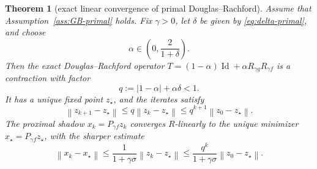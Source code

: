 \documentclass[10pt,leqno]{amsart}
\numberwithin{equation}{section}
\numberwithin{algorithm}{section}
\newtheorem{theorem}{Theorem}[section]
\theoremstyle{remark}
\newcommand{\Id}{\operatorname{Id}}
\newcommand{\norm}[1]{\left\lVert #1 \right\rVert}
\begin{document}
\begin{theorem}[exact linear convergence of primal Douglas--Rachford]
\label{thm:exact-linear-DR}
Assume that Assumption~\ref{ass:GB-primal} holds.  Fix $\gamma>0$, let $\delta$ be given by \eqref{eq:delta-primal}, and choose
\begin{equation}
\label{eq:alpha-range-primal}
  \alpha\in\left(0,\frac{2}{1+\delta}\right).
\end{equation}
Then the exact Douglas--Rachford operator
$T=(1-\alpha)\Id+\alpha R_{\gamma g}R_{\gamma f}$ is a contraction with factor
\begin{equation}
\label{eq:q-primal}
  q:=|1-\alpha|+\alpha\delta<1.
\end{equation}
It has a unique fixed point $z_\star$, and the iterates satisfy
\begin{equation}
\label{eq:exact-z-linear}
  \norm{z_{k+1}-z_\star}
  \le q\norm{z_k-z_\star}
  \le q^{k+1}\norm{z_0-z_\star}.
\end{equation}
The proximal shadow $x_k=P_{\gamma f}z_k$ converges $R$-linearly to the unique minimizer
$x_\star=P_{\gamma f}z_\star$, with the sharper estimate
\begin{equation}
\label{eq:exact-x-linear}
  \norm{x_k-x_\star}
  \le\frac{1}{1+\gamma\sigma}\norm{z_k-z_\star}
  \le\frac{q^k}{1+\gamma\sigma}\norm{z_0-z_\star}.
\end{equation}
\end{theorem}
\end{document}
